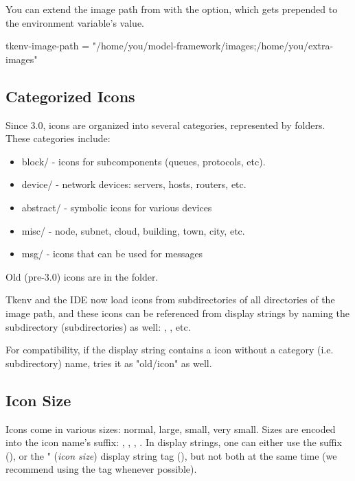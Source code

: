 You can extend the image path from  with the
 option, which gets prepended to the environment
variable's value.

\begin{inifile}
[General]
tkenv-image-path = "/home/you/model-framework/images;/home/you/extra-images"
\end{inifile}


\subsection{Categorized Icons}

Since {\opp} 3.0, icons are organized into several categories, represented
by folders. These categories include:

\begin{itemize}
  \item block/ - icons for subcomponents (queues, protocols, etc).
  \item device/ - network devices: servers, hosts, routers, etc.
  \item abstract/ - symbolic icons for various devices
  \item misc/ - node, subnet, cloud, building, town, city, etc.
  \item msg/ - icons that can be used for messages
\end{itemize}

Old (pre-3.0) icons are in the  folder.

Tkenv and the IDE now load icons from subdirectories of all directories
of the image path, and these icons can be referenced from display strings
by naming the subdirectory (subdirectories) as well:
, , etc.

For compatibility, if the display string contains a icon without
a category (i.e. subdirectory) name, {\opp} tries it as "old/icon" as well.

\subsection{Icon Size}

Icons come in various sizes: normal, large, small, very small. Sizes are
encoded into the icon name's suffix: , , , .
In display strings, one can either use the suffix (),
or the " (\textit{icon size}) display string tag (),
but not both at the same time (we recommend using the  tag whenever possible).


